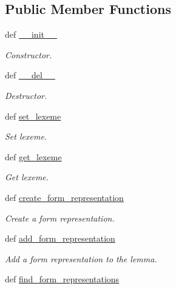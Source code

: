 \subsection*{Public Member Functions}
\begin{DoxyCompactItemize}
\item 
def \hyperlink{classlmf_1_1src_1_1morphology_1_1lemma_1_1_lemma_a17223251bd8318631eccd411fbae8115}{\+\_\+\+\_\+init\+\_\+\+\_\+}
\begin{DoxyCompactList}\small\item\em Constructor. \end{DoxyCompactList}\item 
def \hyperlink{classlmf_1_1src_1_1morphology_1_1lemma_1_1_lemma_afd7a268f1743065f5fc3ee53122ea391}{\+\_\+\+\_\+del\+\_\+\+\_\+}
\begin{DoxyCompactList}\small\item\em Destructor. \end{DoxyCompactList}\item 
def \hyperlink{classlmf_1_1src_1_1morphology_1_1lemma_1_1_lemma_a6d6277e8bb71a04cb31aebccd288b6df}{set\+\_\+lexeme}
\begin{DoxyCompactList}\small\item\em Set lexeme. \end{DoxyCompactList}\item 
def \hyperlink{classlmf_1_1src_1_1morphology_1_1lemma_1_1_lemma_ab1bcf9feeb5f59a7c9af07fbc368fb41}{get\+\_\+lexeme}
\begin{DoxyCompactList}\small\item\em Get lexeme. \end{DoxyCompactList}\item 
def \hyperlink{classlmf_1_1src_1_1morphology_1_1lemma_1_1_lemma_a774f121cbc62e3ad4fad738ba8b68da8}{create\+\_\+form\+\_\+representation}
\begin{DoxyCompactList}\small\item\em Create a form representation. \end{DoxyCompactList}\item 
def \hyperlink{classlmf_1_1src_1_1morphology_1_1lemma_1_1_lemma_ab0acb466271ceb0966afbc1c1dc1cdff}{add\+\_\+form\+\_\+representation}
\begin{DoxyCompactList}\small\item\em Add a form representation to the lemma. \end{DoxyCompactList}\item 
def \hyperlink{classlmf_1_1src_1_1morphology_1_1lemma_1_1_lemma_a19275956725afdcfddbbbb491f6783ca}{find\+\_\+form\+\_\+representations}

\end{DoxyCompactItemize}
